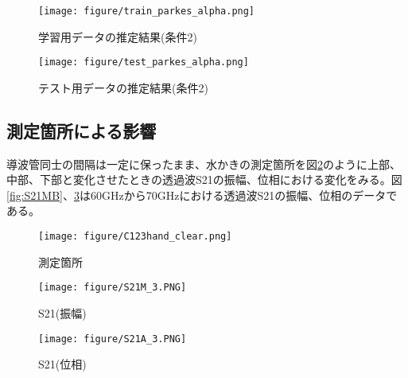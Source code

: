 \documentclass[11pt,a4paper,uplatex,draft]{ujarticle}
\begin{document}
\begin{figure}[htbp]
     \begin{minipage}{0.5\hsize}
         \begin{center}
             \texttt{[image: figure/train\_parkes\_alpha.png]}
         \end{center}
         \caption{学習用データの推定結果(条件2)}
         \label{fig:train2}
     \end{minipage}
     \begin{minipage}{0.5\hsize}
         \begin{center}
             \texttt{[image: figure/test\_parkes\_alpha.png]}
         \end{center}
         \caption{テスト用データの推定結果(条件2)}
         \label{fig:test2}
     \end{minipage}
\end{figure}
\newpage
\subsection{測定箇所による影響}
導波管同士の間隔は一定に保ったまま、水かきの測定箇所を図\ref{fig:hand}のように上部、中部、下部と変化させたときの透過波S21の振幅、位相における変化をみる。図\ref{fig:S21MB}、\ref{fig:S21AB}は60GHzから70GHzにおける透過波S21の振幅、位相のデータである。

\begin{figure}[hbtp]
	\centering
	\texttt{[image: figure/C123hand\_clear.png]}
	\caption{測定箇所}
	\label{fig:hand}
\end{figure}

\begin{figure}[htbp]
    \begin{minipage}{0.5\hsize}
        \begin{center}
            \texttt{[image: figure/S21M\_3.PNG]}
        \end{center}
        \caption{S21(振幅)}
        \label{fig:S21MB}
    \end{minipage}
    \begin{minipage}{0.5\hsize}
        \begin{center}
            \texttt{[image: figure/S21A\_3.PNG]}
        \end{center}
        \caption{S21(位相)}
        \label{fig:S21AB}
    \end{minipage}
\end{figure}
\end{document}
